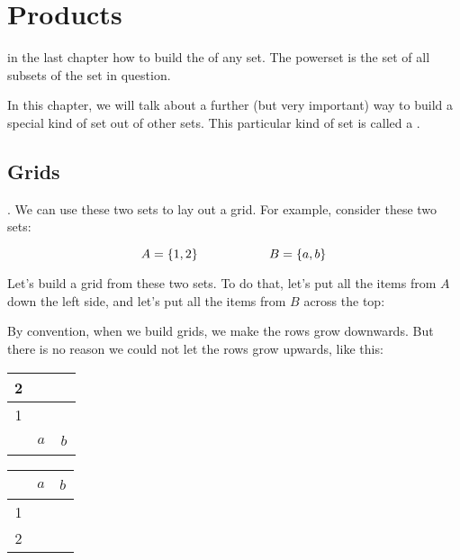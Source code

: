\documentclass[../../../main.tex]{subfiles}
\begin{document}
\chapter{Products}
\label{ch:products}

 in the last chapter how to build the  of any set. The powerset is the set of all subsets of the set in question.

In this chapter, we will talk about a further (but very important) way to build a special kind of set out of other sets. This particular kind of set is called a .


\section{Grids}

. We can use these two sets to lay out a grid. For example, consider these two sets:

\begin{equation*}
  A = \{ 1, 2 \} \hskip 2cm B = \{ a, b \}
\end{equation*}

Let's build a grid from these two sets. To do that, let's put all the items from $A$ down the left side, and let's put all the items from $B$ across the top:

\begin{aside}
  \begin{remark}
    By convention, when we build grids, we make the rows grow downwards. But there is no reason we could not let the rows grow upwards, like this:
    
    \begin{center}
      \begin{tabular}{| c | c | c |}
        \hline
        2 & ~ & ~ \\
        \hline
        1 & ~ & ~ \\
        \hline
        ~ & $a$ & $b$ \\
        \hline
      \end{tabular}
    \end{center}
  \end{remark}
\end{aside}

\begin{center}
  \begin{tabular}{| c | c | c |}
    \hline
    ~ & $a$ & $b$ \\
    \hline
    1 & ~ & ~ \\
    \hline
    2 & ~ & ~ \\
    \hline
  \end{tabular}
\end{center}
\end{document}
